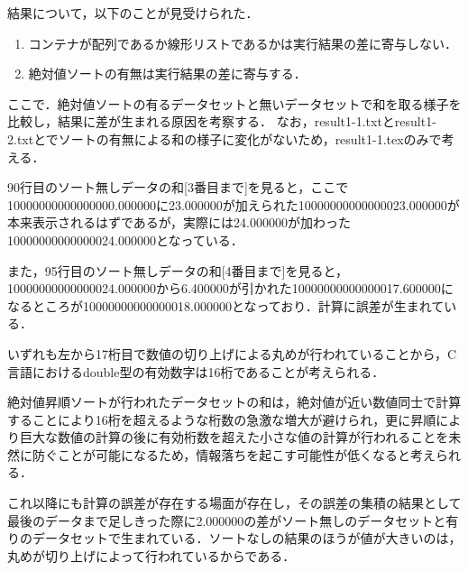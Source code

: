 結果について，以下のことが見受けられた．
\begin{enumerate}
\item コンテナが配列であるか線形リストであるかは実行結果の差に寄与しない．
\item 絶対値ソートの有無は実行結果の差に寄与する．
\end{enumerate}

ここで．絶対値ソートの有るデータセットと無いデータセットで和を取る様子を比較し，結果に差が生まれる原因を考察する．
なお，result1-1.txtとresult1-2.txtとでソートの有無による和の様子に変化がないため，result1-1.texのみで考える．

90行目のソート無しデータの和[3番目まで]を見ると，ここで10000000000000000.000000に23.000000が加えられた10000000000000023.000000が本来表示されるはずであるが，実際には24.000000が加わった10000000000000024.000000となっている．

また，95行目のソート無しデータの和[4番目まで]を見ると，10000000000000024.000000から6.400000が引かれた10000000000000017.600000になるところが10000000000000018.000000となっており．計算に誤差が生まれている．

いずれも左から17桁目で数値の切り上げによる丸めが行われていることから，C言語におけるdouble型の有効数字は16桁であることが考えられる．

絶対値昇順ソートが行われたデータセットの和は，絶対値が近い数値同士で計算することにより16桁を超えるような桁数の急激な増大が避けられ，更に昇順により巨大な数値の計算の後に有効桁数を超えた小さな値の計算が行われることを未然に防ぐことが可能になるため，情報落ちを起こす可能性が低くなると考えられる．

これ以降にも計算の誤差が存在する場面が存在し，その誤差の集積の結果として最後のデータまで足しきった際に2.000000の差がソート無しのデータセットと有りのデータセットで生まれている．ソートなしの結果のほうが値が大きいのは，丸めが切り上げによって行われているからである．







